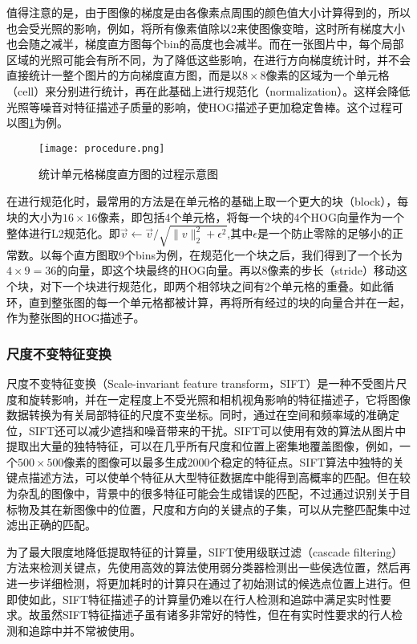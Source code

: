   值得注意的是，由于图像的梯度是由各像素点周围的颜色值大小计算得到的，所以也会受光照的影响，例如，将所有像素值除以2来使图像变暗，这时所有梯度大小也会随之减半，梯度直方图每个bin的高度也会减半。而在一张图片中，每个局部区域的光照可能会有所不同，为了降低这些影响，在进行方向梯度统计时，并不会直接统计一整个图片的方向梯度直方图，而是以$8\times8$像素的区域为一个单元格（cell）来分别进行统计，再在此基础上进行规范化（normalization）。这样会降低光照等噪音对特征描述子质量的影响，使HOG描述子更加稳定鲁棒。这个过程可以图\ref{fig:procedure}为例。

\begin{figure}[htb]
  \centering
  \texttt{[image: procedure.png]}
  \caption{统计单元格梯度直方图的过程示意图}
  \label{fig:procedure}
\end{figure}

  在进行规范化时，最常用的方法是在单元格的基础上取一个更大的块（block），每块的大小为$16\times16$像素，即包括4个单元格，将每一个块的4个HOG向量作为一个整体进行L2规范化。即$\vec{v}\leftarrow\vec{v}/\sqrt{\lVert v \rVert^2_2 + \epsilon^2}$,其中$\epsilon$是一个防止零除的足够小的正常数。以每个直方图取9个bins为例，在规范化一个块之后，我们得到了一个长为$4\times 9=36$的向量，即这个块最终的HOG向量。再以8像素的步长（stride）移动这个块，对下一个块进行规范化，即两个相邻块之间有2个单元格的重叠。如此循环，直到整张图的每一个单元格都被计算，再将所有经过的块的向量合并在一起，作为整张图的HOG描述子。

\subsubsection{尺度不变特征变换}

  尺度不变特征变换（Scale-invariant feature transform，SIFT）是一种不受图片尺度和旋转影响，并在一定程度上不受光照和相机视角影响的特征描述子，它将图像数据转换为有关局部特征的尺度不变坐标。同时，通过在空间和频率域的准确定位，SIFT还可以减少遮挡和噪音带来的干扰。SIFT可以使用有效的算法从图片中提取出大量的独特特征，可以在几乎所有尺度和位置上密集地覆盖图像，例如，一个$500\times500$像素的图像可以最多生成2000个稳定的特征点。SIFT算法中独特的关键点描述方法，可以使单个特征从大型特征数据库中能得到高概率的匹配。但在较为杂乱的图像中，背景中的很多特征可能会生成错误的匹配，不过通过识别关于目标物及其在新图像中的位置，尺度和方向的关键点的子集，可以从完整匹配集中过滤出正确的匹配\cite{lowe2004distinctive}。

  为了最大限度地降低提取特征的计算量，SIFT使用级联过滤（cascade filtering）方法来检测关键点，先使用高效的算法使用弱分类器检测出一些侯选位置，然后再进一步详细检测，将更加耗时的计算只在通过了初始测试的候选点位置上进行。但即使如此，SIFT特征描述子的计算量仍难以在行人检测和追踪中满足实时性要求\cite{zhou2009object}。故虽然SIFT特征描述子虽有诸多非常好的特性，但在有实时性要求的行人检测和追踪中并不常被使用。

